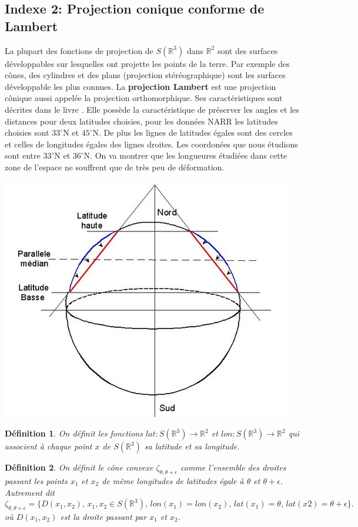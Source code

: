 \documentclass[a4paper,10pt]{article}
\newtheorem{definition}{Définition}
\begin{document}
\subsection{Indexe 2: Projection conique conforme de Lambert}
\label{proj-Lambert}
La plupart des fonctions de projection de $S(\mathbb{R}^3)$ dans $\mathbb{R}^2$ sont des surfaces développables sur lesquelles ont projette les points de la terre. Par exemple des cônes, des cylindres et des plans (projection stéréographique) sont les surfaces développable les plus connues. La \textbf{projection Lambert} est une projection cônique aussi appelée la projection orthomorphique. Ses caractéristiques sont décrites dans le livre \cite{grafarend2014map}. Elle possède la caractéristique de préserver les angles et les distances pour deux latitudes choisies, pour les données NARR les latitudes choisies sont $33^{\circ}$N et $45^{\circ}$N. De plus les lignes de latitudes égales sont des cercles et celles de longitudes égales des lignes droites. Les coordonées que nous étudions sont entre $33^{\circ}$N et $36^{\circ}$N. On va montrer que les longueures étudiées dans cette zone de l'espace ne souffrent que de très peu de déformation. 


\begin{center}
	\includegraphics[scale=0.4]{lambert.jpg}
\end{center}

\begin{definition}
	On définit les fonctions $lat:S(\mathbb{R}^3)\to \mathbb{R}^2 $ et $lon:S(\mathbb{R}^3)\to \mathbb{R}^2 $ qui associent à chaque point $x$ de $S(\mathbb{R}^3)$ sa latitude et sa longitude.
\end{definition} 
\begin{definition}
	On définit le cône convexe $\zeta_{\theta,\theta+\epsilon}$ comme l'ensemble des droites passant les points $x_1$ et $x_2$ de même longitudes de latitudes égale à $\theta$ et $\theta+\epsilon$. Autrement dit
	\[\zeta_{\theta,\theta+\epsilon}=\{D(x_1,x_2), \, x_1,x_2 \in S(\mathbb{R}^3), \, lon(x_1)=lon(x_2),\, lat(x_1)=\theta,\, lat(x2)=\theta+\epsilon\}.\] 
	où $D(x_1,x_2)$ est la droite passant par $x_1$ et $x_2$.
\end{definition}
\end{document}
